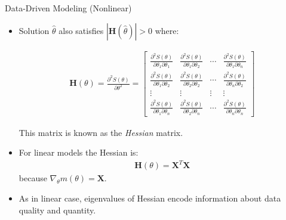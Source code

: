 \documentclass[handout,9pt]{beamer}
\begin{document}
%
\begin{frame}{Data-Driven Modeling (Nonlinear)}

\begin{itemize}
\setlength{\itemsep}{10pt}
\item Solution $\hat{\theta}$ also satisfies $|\mathbf{H}(\hat{\theta})|>0$ where:
\begin{footnotesize}
\begin{align*}
\mathbf{H}(\theta)=\frac{\partial^2 S(\theta)}{\partial \theta^2}=
\left[\begin{array}{ccccccccc}
\frac{\partial^2 S(\theta)}{\partial \theta_1\partial \theta_1}&\frac{\partial^2 S(\theta)}{\partial \theta_1\partial \theta_2}&\cdots& \frac{\partial^2 S(\theta)}{\partial \theta_1\partial \theta_n}\\
\frac{\partial^2 S(\theta)}{\partial \theta_1\partial \theta_2}&\frac{\partial^2 S(\theta)}{\partial \theta_2\partial \theta_2}&\cdots&\frac{\partial^2 S(\theta)}{\partial \theta_n\partial \theta_2}\\
\vdots & \vdots &\vdots &\vdots\\
\frac{\partial^2 S(\theta)}{\partial \theta_1\partial \theta_n}&\frac{\partial^2 S(\theta)}{\partial \theta_2\partial \theta_n}&\cdots& \frac{\partial^2 S(\theta)}{\partial \theta_n\partial \theta_n}
\end{array}\right]
\end{align*}
\end{footnotesize}
This matrix is known as the {\em Hessian} matrix. 
\item For linear models the Hessian is:
\begin{align*}
\mathbf{H}(\theta)=\mathbf{X}^T\mathbf{X}
\end{align*}
because  $\nabla_\theta m(\theta)=\mathbf{X}$.  
\item As in linear case, eigenvalues of Hessian encode information about data quality and quantity. 
\end{itemize}
\end{frame}
\end{document}
